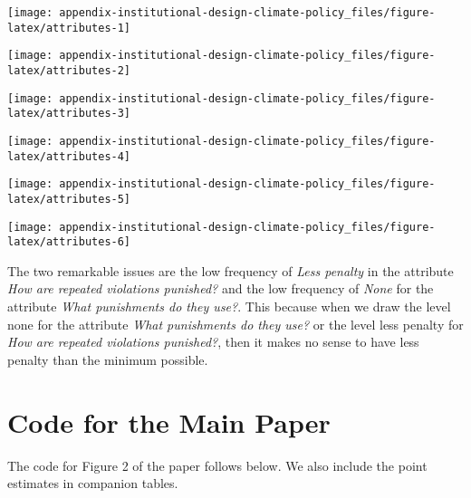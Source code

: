 \documentclass[12pt,a4paper,]{article}
\begin{document}
\begin{center}\texttt{[image: appendix-institutional-design-climate-policy\_files/figure-latex/attributes-1]} \end{center}

\begin{center}\texttt{[image: appendix-institutional-design-climate-policy\_files/figure-latex/attributes-2]} \end{center}

\begin{center}\texttt{[image: appendix-institutional-design-climate-policy\_files/figure-latex/attributes-3]} \end{center}

\begin{center}\texttt{[image: appendix-institutional-design-climate-policy\_files/figure-latex/attributes-4]} \end{center}

\begin{center}\texttt{[image: appendix-institutional-design-climate-policy\_files/figure-latex/attributes-5]} \end{center}

\begin{center}\texttt{[image: appendix-institutional-design-climate-policy\_files/figure-latex/attributes-6]} \end{center}

The two remarkable issues are the low frequency of \emph{Less penalty}
in the attribute \emph{How are repeated violations punished?} and the
low frequency of \emph{None} for the attribute \emph{What punishments do
they use?}. This because when we draw the level none for the attribute
\emph{What punishments do they use?} or the level less penalty for
\emph{How are repeated violations punished?}, then it makes no sense to
have less penalty than the minimum possible.

\hypertarget{code-for-the-main-paper}{%
\section{Code for the Main Paper}\label{code-for-the-main-paper}}

The code for Figure 2 of the paper follows below. We also include the
point estimates in companion tables.
\end{document}
